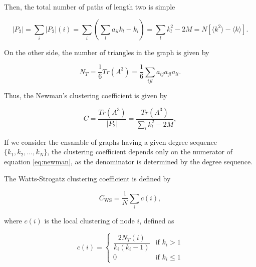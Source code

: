 \documentclass{article}
\begin{document}
Then, the total number of paths of length two is simple 

\begin{equation} \label{eq:P2}
    |P_2| = \sum_i |P_2|(i) = \sum_i \left( \sum_{l} a_{il} k_l - k_i \right) = \sum_l k_l^2 - 2M = N\left[\langle k^2 \rangle - \langle k \rangle\right].
\end{equation}

On the other side, the number of triangles in the graph is given by

\begin{equation} \label{eq:T}
    N_T = \dfrac{1}{6} Tr(A^3) = \dfrac{1}{6} \sum_{ijl} a_{ij} a_{jl} a_{li}.
\end{equation}

Thus, the Newman's clustering coefficient is given by

\begin{equation} \label{eq:newman}
    C = \dfrac{Tr(A^3)}{|P_2|} = \dfrac{Tr(A^3)}{\sum_l k_l^2 - 2M},
\end{equation}

If we consider the ensamble of graphs having a given degree sequence $\lbrace k_1, k_2, \dots, k_N\rbrace$, the clustering coefficient depends only on the numerator of equation \ref{eq:newman}, as the denominator is determined by the degree sequence.

The Watts-Strogatz clustering coefficient is defined by

\begin{equation} \label{eq:ws}
    C_{\mathrm{WS}} = \dfrac{1}{N} \sum_{i} c(i),
\end{equation}

where $c(i)$ is the local clustering of node $i$, defined as

\begin{equation}
    c(i) = 
    \left\{
    	\begin{array}{ll}
    		\dfrac{2 N_{T}(i)}{k_i (k_i-1)}  & \mbox{if } k_i > 1 \\
    		0 & \mbox{if } k_i \leq 1
    	\end{array}
    \right.
\end{equation}

\end{document}
